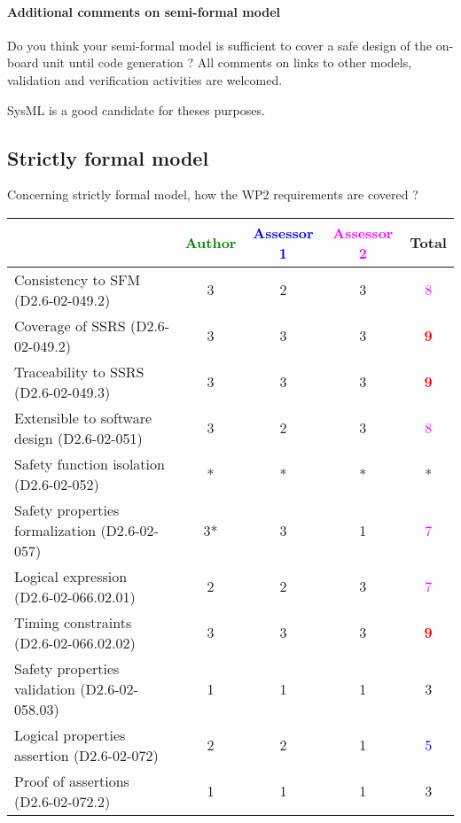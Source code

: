 \paragraph{Additional comments on semi-formal  model} Do you think your semi-formal  model is sufficient to cover a safe design of the on-board unit until code generation ?
All comments on links to  other models, validation and verification activities are welcomed.
\begin{author_comment}
SysML \cite{sysmlbook} is a good candidate for theses purposes.
\end{author_comment}
\subsection{Strictly formal model}

Concerning strictly formal model, how the WP2 requirements are covered ?

\begin{tabular}{|l | c | c | c | c|}
\hline
& \textcolor{green}{Author} & \textcolor{blue}{Assessor 1} & \textcolor{magenta}{Assessor 2} & Total \\
\hline 
Consistency to SFM (D2.6-02-049.2) &3 & 2    & 3     & \textcolor{magenta}{8} \\
\hline
Coverage of SSRS (D2.6-02-049.2)  & 3    & 3    & 3    & \textcolor{red}{\textbf{9}} \\
\hline
Traceability to  SSRS (D2.6-02-049.3)  & 3    & 3    & 3    & \textcolor{red}{\textbf{9}} \\
\hline
Extensible to software design (D2.6-02-051)  &3 & 2    & 3    & \textcolor{magenta}{8}  \\
\hline
Safety function isolation (D2.6-02-052)  & *  & * & * & * \\
\hline 
Safety properties formalization (D2.6-02-057)  &3* & 3     & 1     & \textcolor{magenta}{7} \\
\hline
Logical expression (D2.6-02-066.02.01)  &2 & 2    & 3     & \textcolor{magenta}{7}  \\
\hline
Timing constraints (D2.6-02-066.02.02)  &3 & 3    & 3    & \textcolor{red}{\textbf{9}} \\
\hline
Safety properties validation (D2.6-02-058.03)  &1 & 1    & 1    &  3 \\
\hline
Logical properties assertion (D2.6-02-072)  &2 & 2    & 1    & \textcolor{blue}{5} \\
\hline
Proof of assertions (D2.6-02-072.2)  &1 & 1    & 1    & 3     \\
\hline
\end{tabular}

